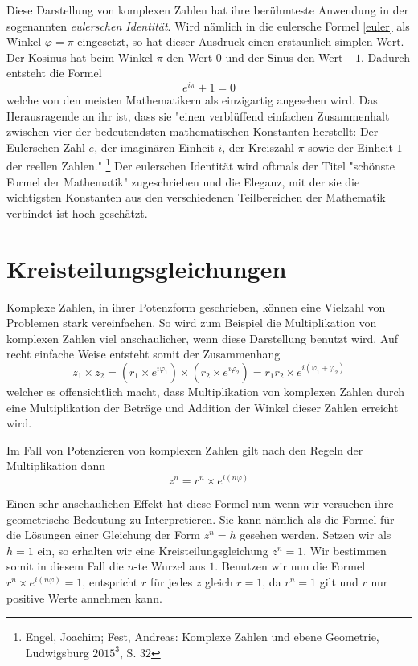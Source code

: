 \documentclass[a4paper,12pt]{article} %
\begin{document}

Diese Darstellung von komplexen Zahlen hat ihre berühmteste Anwendung in der sogenannten \emph{eulerschen Identität}.
Wird nämlich in die eulersche Formel \eqref{euler} als Winkel $\varphi=\pi$ eingesetzt, so hat dieser Ausdruck einen erstaunlich simplen Wert.
Der Kosinus hat beim Winkel $\pi$ den Wert $0$ und der Sinus den Wert $-1$.
Dadurch entsteht die Formel
\[e^{i\pi}+1=0\]
welche von den meisten Mathematikern als einzigartig angesehen wird.
Das Herausragende an ihr ist, dass sie "{}einen verblüffend einfachen Zusammenhalt zwischen vier der bedeutendsten mathematischen Konstanten herstellt:
Der Eulerschen Zahl $e$, der imaginären Einheit $i$, der Kreiszahl $\pi$ sowie der Einheit $1$ der reellen Zahlen."
\footnote{Engel, Joachim; Fest, Andreas: Komplexe Zahlen und ebene Geometrie, Ludwigsburg $2015^3$, S. $32$}
Der eulerschen Identität wird oftmals der Titel "{}schönste Formel der Mathematik"{} zugeschrieben und die Eleganz, mit der sie die wichtigsten Konstanten aus den verschiedenen Teilbereichen der Mathematik verbindet ist hoch geschätzt.\\



\section{Kreisteilungsgleichungen}



Komplexe Zahlen, in ihrer Potenzform geschrieben, können eine Vielzahl von Problemen stark vereinfachen.
So wird zum Beispiel die Multiplikation von komplexen Zahlen viel anschaulicher, wenn diese Darstellung benutzt wird.
Auf recht einfache Weise entsteht somit der Zusammenhang
\[z_1\times z_2=(r_1 \times e^{i\varphi_1}) \times (r_2 \times e^{i\varphi_2})=r_1 r_2 \times e^{i(\varphi_1+\varphi_2)}\]
welcher es offensichtlich macht, dass Multiplikation von komplexen Zahlen durch eine Multiplikation der Beträge und Addition der Winkel dieser Zahlen erreicht wird.

Im Fall von Potenzieren von komplexen Zahlen gilt nach den Regeln der Multiplikation dann
\[z^n=r^n \times e^{i(n\varphi)}\]

Einen sehr anschaulichen Effekt hat diese Formel nun wenn wir versuchen ihre geometrische Bedeutung zu Interpretieren.
Sie kann nämlich als die Formel für die Lösungen einer Gleichung der Form $z^n=h$ gesehen werden.
Setzen wir als $h=1$ ein, so erhalten wir eine Kreisteilungsgleichung $z^n=1$. Wir bestimmen somit in diesem Fall die $n$-te Wurzel aus $1$.
Benutzen wir nun die Formel $r^n \times e^{i(n\varphi)}=1$, entspricht $r$ für jedes $z$ gleich $r=1$, da $r^n=1$ gilt und $r$ nur positive Werte annehmen kann.\\
\end{document}
